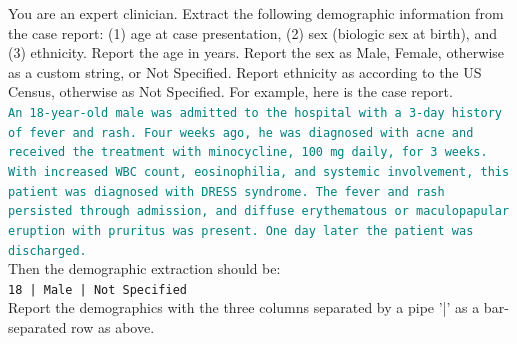 \begin{tcolorbox}[
  colback=gray!5,
  colframe=gray!100,
  title={Prompt},
  boxrule=2pt,
  enhanced,
  breakable,                %
  before skip=8pt,          %
  after skip=8pt,           %
  pad at break*=2mm,        %
  fontupper=\scriptsize,
  title after break={{Prompt}} %
]
You are an expert clinician. Extract the following demographic information from the case report: (1) age at case presentation, (2) sex (biologic sex at birth), and (3) ethnicity.  Report the age in years.  Report the sex as Male, Female, otherwise as a custom string, or Not Specified.  Report ethnicity as according to the US Census, otherwise as Not Specified.  For example, here is the case report.\\

\textcolor{teal}{\texttt{An 18-year-old male was admitted to the hospital with a 3-day history of fever and rash. Four weeks ago, he was diagnosed with acne and received the treatment with minocycline, 100 mg daily, for 3 weeks. With increased WBC count, eosinophilia, and systemic involvement, this patient was diagnosed with DRESS syndrome. The fever and rash persisted through admission, and diffuse erythematous or maculopapular eruption with pruritus was present. One day later the patient was discharged.}}\\

Then the demographic extraction should be:\\
\texttt{18 | Male | Not Specified} \\
 
Report the demographics with the three columns separated by a pipe '|' as a bar-separated row as above.
\end{tcolorbox}
